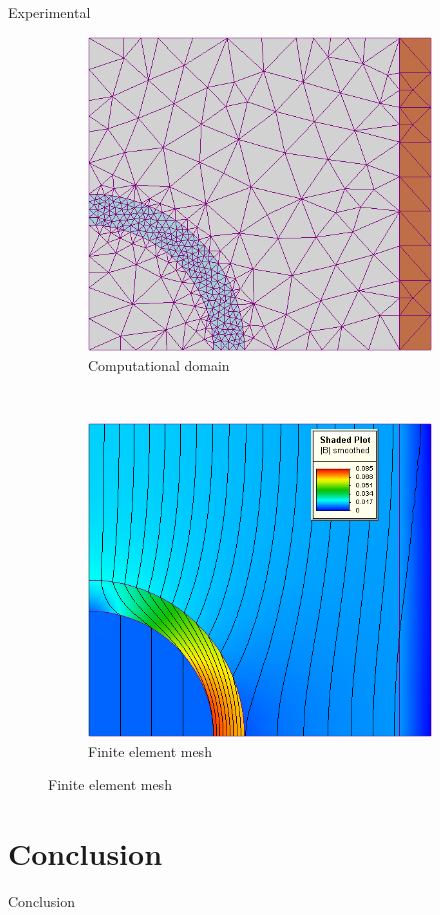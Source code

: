\documentclass[mathserif,12pt,handout,notes=show]{beamer}
\begin{document}
\begin{frame}{Experimental}
 
    \begin{figure}
        \centering
        \begin{subfigure}[b]{0.5\textwidth}
            \includegraphics[width=\textwidth]{example-01}
            \caption{Computational domain}
        \end{subfigure}%
        ~
        \begin{subfigure}[b]{0.5\textwidth}
            \includegraphics[width=\textwidth]{example-02}
            \caption{Finite element mesh}
        \end{subfigure}%
    \end{figure}
    
\end{frame}
\note{
	\lipsum[1]
}

\section{Conclusion}

\begin{frame}{Conclusion}
 
    \lipsum[1]
    
\end{frame}
\note{
    \lipsum[1]
}
\end{document}
